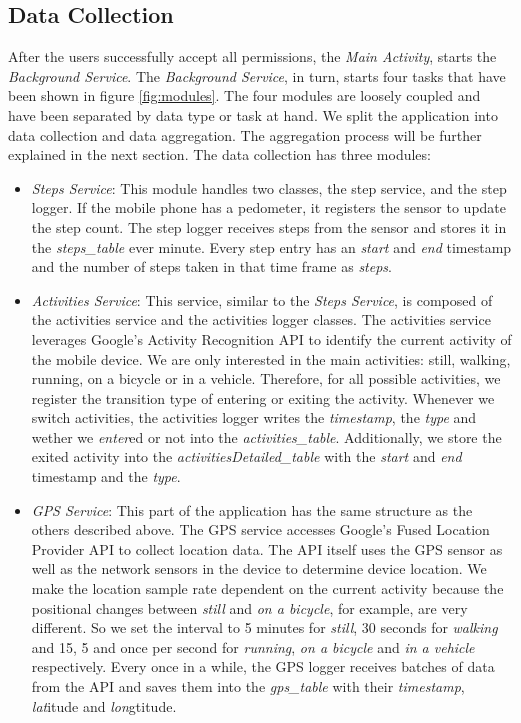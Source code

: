 \subsection{Data Collection}
After the users successfully accept all permissions, the \textit{Main Activity}, starts the \textit{Background Service}. The \textit{Background Service}, in turn, starts four tasks that have been shown in figure \ref{fig:modules}. The four modules are loosely coupled and have been separated by data type or task at hand. We split the application into data collection and data aggregation. The aggregation process will be further explained in the next section. The data collection has three modules:
\begin{itemize}
    \item \textit{Steps Service}: This module handles two classes, the step service, and the step logger. If the mobile phone has a pedometer, it registers the sensor to update the step count. The step logger receives steps from the sensor and stores it in the \textit{steps\_table} ever minute. Every step entry has an \textit{start} and \textit{end} timestamp and the number of steps taken in that time frame as \textit{steps}.
    \item \textit{Activities Service}: This service, similar to the \textit{Steps Service}, is composed of the activities service and the activities logger classes. The activities service leverages Google's Activity Recognition API to identify the current activity of the mobile device. We are only interested in the main activities: still, walking, running, on a bicycle or in a vehicle. Therefore, for all possible activities, we register the transition type of entering or exiting the activity. Whenever we switch activities, the activities logger writes the \textit{timestamp}, the \textit{type} and wether we \textit{enter}ed or not into the \textit{activities\_table}. Additionally, we store the exited activity into the \textit{activitiesDetailed\_table} with the \textit{start} and \textit{end} timestamp and the \textit{type}.
     \item \textit{GPS Service}: This part of the application has the same structure as the others described above. The GPS service accesses Google's Fused Location Provider API to collect location data. The API itself uses the GPS sensor as well as the network sensors in the device to determine device location. We make the location sample rate dependent on the current activity because the positional changes between \textit{still} and \textit{on a bicycle}, for example, are very different. So we set the interval to 5 minutes for \textit{still}, 30 seconds for \textit{walking} and 15, 5 and once per second for \textit{running}, \textit{on a bicycle} and \textit{in a vehicle} respectively. Every once in a while, the GPS logger receives batches of data from the API and saves them into the \textit{gps\_table} with their  \textit{timestamp}, \textit{lat}itude and \textit{lon}gtitude.
\end{itemize}

